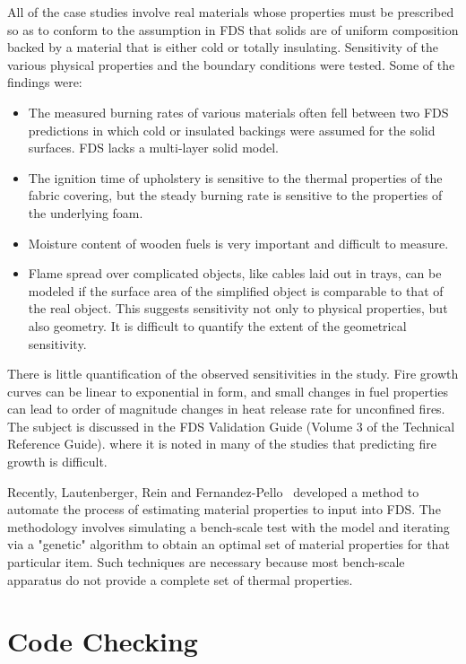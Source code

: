 \documentclass[11pt]{book}
\begin{document}
All of the  case studies involve real materials  whose properties must be prescribed  so as to conform  to the assumption in  FDS that solids are of
uniform composition backed by a material that is either cold or totally insulating. Sensitivity of the various physical properties and the boundary
conditions were tested. Some of the findings were:
\begin{itemize}
\item  The measured  burning  rates of  various  materials often  fell
between two FDS  predictions in which cold or  insulated backings were assumed for the solid surfaces. FDS lacks a multi-layer solid model.
\item  The ignition  time of  upholstery is  sensitive to  the thermal
properties  of the  fabric covering,  but the  steady burning  rate is sensitive to the properties of the underlying foam.
\item Moisture content of wooden fuels is very important and difficult
to measure.
\item Flame spread  over complicated objects, like cables  laid out in
trays, can be modeled if the  surface area of the simplified object is comparable to that  of the real object. This  suggests sensitivity not only to
physical properties,  but also geometry.  It is  difficult to quantify the extent of the geometrical sensitivity.
\end{itemize}
There is  little quantification of  the observed sensitivities  in the study. Fire  growth curves can be  linear to exponential  in form, and small
changes in  fuel  properties  can lead  to  order of  magnitude changes  in heat  release rate  for unconfined  fires. The  subject is
discussed  in the  FDS  Validation Guide (Volume 3 of the Technical Reference Guide).
where it is  noted in many of the studies  that predicting fire growth is difficult.

Recently, Lautenberger, Rein and Fernandez-Pello~\cite{Lautenberger:FSJ} developed a method to automate the
process of  estimating material properties to input  into FDS. The methodology involves simulating a  bench-scale test with the model and iterating
via a  "genetic"  algorithm  to obtain  an  optimal set  of material  properties for  that  particular item.  Such techniques  are necessary because
most bench-scale apparatus do not provide a complete set of thermal properties.



\section{Code Checking}
\label{Code Checking}
\end{document}
